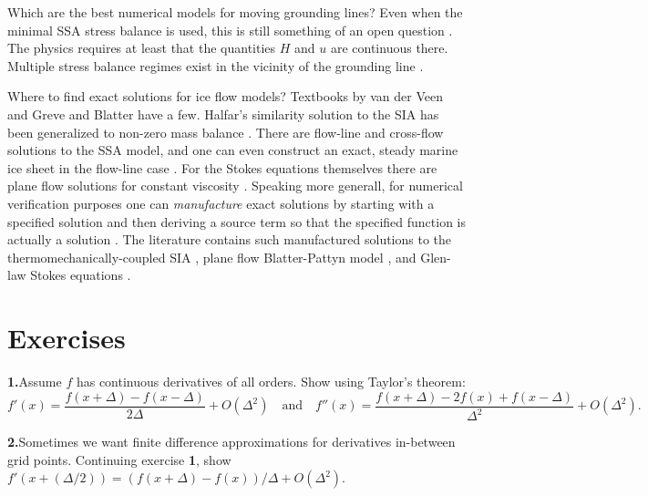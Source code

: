 \documentclass[letterpaper,final,12pt,reqno]{amsart}
\begin{document}
Which are the best numerical models for moving grounding lines?  Even when the minimal SSA stress balance is used, this is still something of an open question \cite{Feldmannetal2014,Goldbergetal2009,MISMIP3d2013,MISMIP2012,SchoofMarine1}.  The physics requires at least that the quantities $H$ and $u$ are continuous there.  Multiple stress balance regimes exist in the vicinity of the grounding line \cite{SchoofMarine2}.

Where to find exact solutions for ice flow models?  Textbooks by van der Veen \cite{vanderVeen} and Greve and Blatter \cite{GreveBlatter2009} have a few.  Halfar's similarity solution to the SIA \cite{Halfar81,Halfar83} has been generalized to non-zero mass balance \cite{BLKCB}.  There are flow-line \cite{Bodvardsson,vanderVeen83} and cross-flow \cite{SchoofStream} solutions to the SSA model, and one can even construct an exact, steady marine ice sheet in the flow-line case \cite{Bueler2014exactmarine}.  For the Stokes equations themselves there are plane flow solutions for constant viscosity \cite{BaliseRaymond1985}.  Speaking more generall, for numerical verification purposes one can \emph{manufacture} exact solutions by starting with a specified solution and then deriving a source term so that the specified function is actually a solution \cite{Bueler2021,Roache}.  The literature contains such manufactured solutions to the thermomechanically-coupled SIA \cite{BBL}, plane flow Blatter-Pattyn model \cite{GlowinskiRappaz}, and Glen-law Stokes equations \cite{JouvetRappaz2011,Lengetal2012,SargentFastook2010}.

\footnotesize

\bigskip
\bigskip
%


\bigskip
\bigskip
\small
\section*{Exercises}

\newcommand{\exer}[2]{\medskip\noindent \textbf{#1.}\quad #2}

\exer{1}{Assume $f$ has continuous derivatives of all orders.  Show using Taylor's theorem:
  $$f'(x) = \frac{f(x+\Delta) - f(x-\Delta)}{2\Delta} + O(\Delta^2) \quad \text{and} \quad f''(x) = \frac{f(x+\Delta) - 2 f(x) + f(x-\Delta)}{\Delta^2} + O(\Delta^2).$$}

\exer{2}{Sometimes we want finite difference approximations for derivatives in-between grid points.  Continuing exercise \textbf{1}, show $f'(x+(\Delta/2)) = (f(x+\Delta) - f(x))/\Delta + O(\Delta^2)$.}
\end{document}
